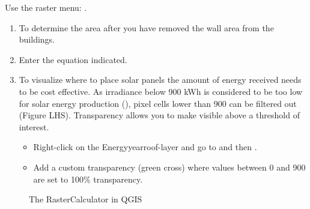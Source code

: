 \documentclass[letterpaper,10pt,english]{sphinxmanual}
\begin{document}
Use the raster menu: .
\begin{enumerate}
\item {} 
To determine the area after you have removed the wall area from the
buildings.

\item {} 
Enter the equation indicated.

\item {} 
To visualize where to place solar panels the amount of energy
received needs to be cost effective. As irradiance below 900 kWh is
considered to be too low for solar energy production (), pixel cells lower than
900 can be filtered out (Figure LHS). Transparency \textendash{} allows you to
make visible above a threshold of interest.
\begin{itemize}
\item {} 
Right-click on the Energyyearroof-layer and go to 
and then .

\item {} 
Add a custom transparency (green cross) where values between 0 and
900 are set to 100\% transparency.

\end{itemize}

\end{enumerate}

\begin{figure}[htbp]
\centering
\capstart

\noindent{}
\caption{The RasterCalculator in QGIS}\label{\detokenize{Tutorials/SEBE:id7}}\end{figure}
\end{document}
